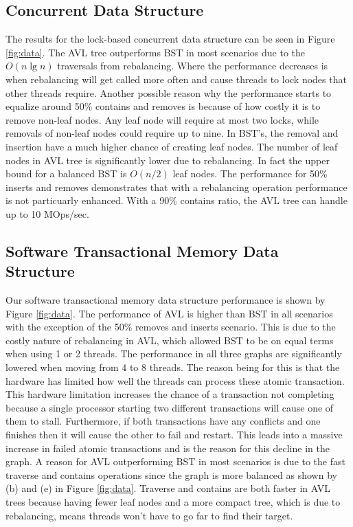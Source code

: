 \documentclass[conference]{IEEEtran}
\theoremstyle{definition}
\theoremstyle{theorem}
\begin{document}
\subsection{Concurrent Data Structure}
The results for the lock-based concurrent data structure can be seen in Figure \ref{fig:data}. The AVL tree outperforms BST in most scenarios due to the $O(n\lg n)$ traversals from rebalancing. Where the performance decreases is when rebalancing will get called more often and cause threads to lock nodes that other threads require. Another possible reason why the performance starts to equalize around 50\% contains and removes is because of how costly it is to remove non-leaf nodes. Any leaf node will require at most two locks, while removals of non-leaf nodes could require up to nine. In BST's, the removal and insertion have a much higher chance of creating leaf nodes. The number of leaf nodes in AVL tree is significantly lower due to rebalancing. In fact the upper bound for a balanced BST is $O(n/2)$ leaf nodes. The performance for 50\% inserts and removes demonstrates that with a rebalancing operation performance is not particuarly enhanced. With a 90\% contains ratio, the AVL tree can handle up to 10 MOps/sec.

\subsection{Software Transactional Memory Data Structure}
Our software transactional memory data structure performance is shown by Figure \ref{fig:data}. The performance of AVL is higher than BST in all scenarios with the exception of the 50\% removes and inserts scenario. This is due to the costly nature of rebalancing in AVL, which allowed BST to be on equal terms when using 1 or 2 threads. The performance in all three graphs are significantly lowered when moving from 4 to 8 threads. The reason being for this is that the hardware has limited how well the threads can process these atomic transaction. This hardware limitation increases the chance of a transaction not completing because a single processor starting two different transactions will cause one of them to stall. Furthermore, if both transactions have any conflicts and one finishes then it will cause the other to fail and restart. This leads into a massive increase in failed atomic transactions and is the reason for this decline in the graph. A reason for AVL outperforming BST in most scenarios is due to the fast traverse and contains operations since the graph is more balanced as shown by (b) and (e) in Figure \ref{fig:data}. Traverse and contains are both faster in AVL trees because having fewer leaf nodes and a more compact tree, which is due to rebalancing, means threads won't have to go far to find their target.
\end{document}
